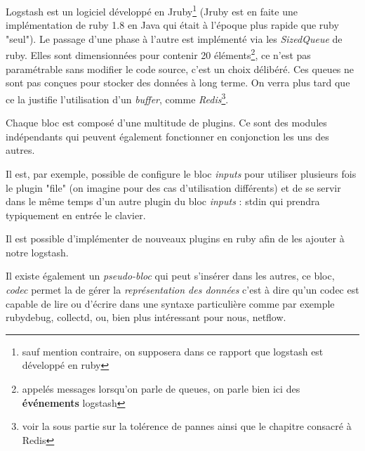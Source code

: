 Logstash est un logiciel développé en Jruby\footnote{sauf mention contraire, on supposera
dans ce rapport que logstash est développé en ruby} (Jruby est en faite une implémentation
de ruby 1.8 en Java qui était à l'époque plus rapide que ruby "seul"). 
Le passage d'une phase à l'autre est implémenté via les \emph{SizedQueue} de ruby. 
Elles sont dimensionnées pour contenir 20 éléments\footnote{appelés messages lorsqu'on parle de queues, on parle bien ici 
des \textbf{événements} logstash}, ce n'est pas paramétrable sans modifier le code 
source, c'est un choix délibéré. Ces queues ne sont pas conçues pour stocker des 
données à long terme. On verra plus tard que ce la justifie l'utilisation d'un 
\textit{buffer}, comme \emph{Redis}\footnote{voir la sous partie sur la tolérence
de pannes ainsi que le chapitre consacré à Redis}.


Chaque bloc est composé d'une multitude de plugins. Ce sont des modules indépendants
qui peuvent également fonctionner en conjonction les uns des autres.

Il est, par exemple, possible de configure le bloc \emph{inputs} pour utiliser 
plusieurs fois le plugin "file" (on imagine pour des cas d'utilisation différents) 
et de se servir dans le même temps d'un autre plugin du bloc \emph{inputs} : stdin 
qui prendra typiquement en entrée le clavier.


Il est possible d'implémenter de nouveaux plugins en ruby afin de les ajouter à
notre logstash.

Il existe également un \textit{pseudo-bloc} qui peut s'insérer dans les autres, ce 
bloc, \emph{codec} permet la de gérer la \textit{représentation des données} c'est 
à dire qu'un codec est capable de lire ou d'écrire dans une syntaxe particulière 
comme par exemple rubydebug, collectd, ou, bien plus intéressant pour nous, netflow.




